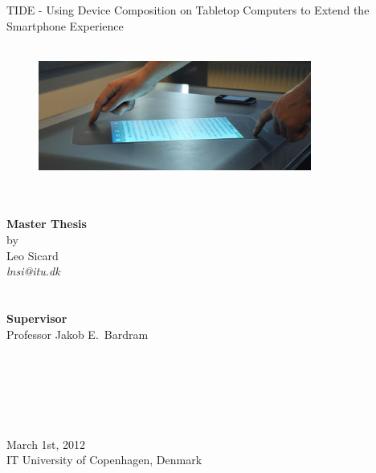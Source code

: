 \documentclass[a4paper,11pt,twoside,onecolumn,openright]{memoir}
\begin{document}

\pagestyle{empty}

\begin{centering}
\hfill\\
\hfill\\
\hfill\\
\hfill\\

\Huge TIDE - Using Device Composition on Tabletop Computers to Extend the Smartphone Experience
\hfill\\
\hfill\\
\begin{figure}[h!]
  \centering
    \includegraphics[width=0.8\textwidth]{images/tide314}
\end{figure}
\large
\hfill\\
\hfill\\
\textbf{Master Thesis}\\by\\Leo Sicard\\
\emph{lnsi@itu.dk}\\
\hfill\\
\hfill\\
\textbf{Supervisor}\\Professor Jakob E.\ Bardram\\
\hfill\\
\hfill\\
\hfill\\
\hfill\\
\hfill\\
\hfill\\
March 1st, 2012\\IT University of Copenhagen, Denmark\\
\end{centering}
\clearpage
\end{document}
